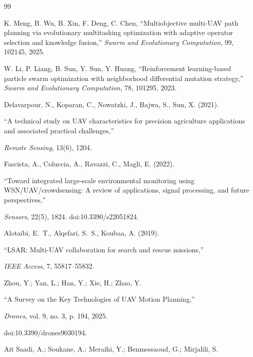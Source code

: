 \documentclass[fleqn,10pt]{wlscirep}
\begin{document}
\begin{thebibliography}{99}

K. Meng, B. Wu, B. Xin, F. Deng, C. Chen,
``Multiobjective multi-UAV path planning via evolutionary multitasking optimization with adaptive operator selection and knowledge fusion,''
\textit{Swarm and Evolutionary Computation}, 99, 102145, 2025.

W. Li, P. Liang, B. Sun, Y. Sun, Y. Huang,
``Reinforcement learning-based particle swarm optimization with neighborhood differential mutation strategy,''
\textit{Swarm and Evolutionary Computation}, 78, 101295, 2023.


Delavarpour, N., Koparan, C., Nowatzki, J., Bajwa, S., Sun, X. (2021).

``A technical study on UAV characteristics for precision agriculture applications and associated practical challenges,''

\textit{Remote Sensing}, 13(6), 1204.




Fascista, A., Coluccia, A., Ravazzi, C., Magli, E. (2022).

``Toward integrated large-scale environmental monitoring using WSN/UAV/crowdsensing: A review of applications, signal processing, and future perspectives,''

\textit{Sensors}, 22(5), 1824. doi:10.3390/s22051824.




Alotaibi, E.~T., Alqefari, S.~S., Koubaa, A. (2019).

``LSAR: Multi-UAV collaboration for search and rescue missions,''

\textit{IEEE Access}, 7, 55817--55832.




Zhou, Y.; Yan, L.; Han, Y.; Xie, H.; Zhao, Y.  

``A Survey on the Key Technologies of UAV Motion Planning,''  

\textit{Drones}, vol. 9, no. 3, p. 194, 2025.  

doi:10.3390/drones9030194.




Ait Saadi, A.; Soukane, A.; Meraihi, Y.; Benmessaoud, G.; Mirjalili, S.  


\end{thebibliography}
\end{document}
